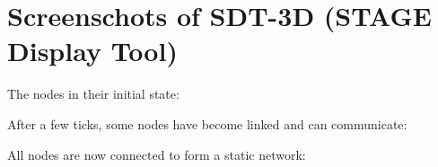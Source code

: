 \documentclass{article}
\begin{document}
\section{Screenschots of SDT-3D (STAGE Display Tool)}
The nodes in their initial state:

After a few ticks, some nodes have become linked and can communicate:

All nodes are now connected to form a static network:
\end{document}
